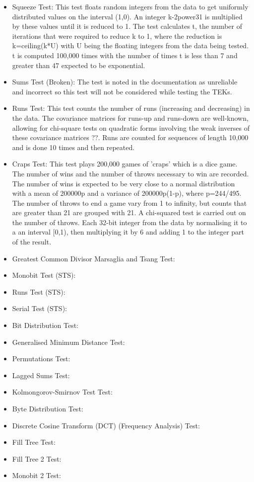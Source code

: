 \begin{itemize}
\item Squeeze Test: This test floats random integers from the data to get uniformly distributed values on the interval (1,0). An integer k-2power31 is multiplied by these values until it is reduced to 1. The test calculates t, the number of iterations that were required to reduce k to 1, where the reduction is k=ceiling(k*U) with U being the floating integers from the data being tested. t is computed 100,000 times with the number of times t is less than 7 and greater than 47 expected to be exponential.
\item Sums Test (Broken): The test is noted in the documentation as unreliable and incorrect so this test will not be considered while testing the TEKs.
\item Runs Test: This test counts the number of runs (increasing and decreasing) in the data. The covariance matrices for runs-up and runs-down are well-known, allowing for chi-square tests on quadratic forms involving the weak inverses of these covariance matrices ??. Runs are counted for sequences of length 10,000 and is done 10 times and then repeated.
\item Craps Test: This test plays 200,000 games of 'craps' which is a dice game. The number of wins and the number of throws necessary to win are recorded. The number of wins is expected to be very close to a normal distribution with a mean of 200000p and a variance of 200000p(1-p), where p=244/495. The number of throws to end a game vary from 1 to infinity, but counts that are greater than 21 are grouped with 21. A chi-squared test is carried out on the number of throws. Each 32-bit integer from the data by normalising it to a an interval [0,1), then multiplying it by 6 and adding 1 to the integer part of the result. 
\item Greatest Common Divisor Marsaglia and Tsang Test:
\item Monobit Test (STS):
\item Runs Test (STS):
\item Serial Test (STS):
\item Bit Distribution Test:
\item Generalised Minimum Distance Test:
\item Permutations Test:
\item Lagged Sums Test:
\item Kolmongorov-Smirnov Test Test:
\item Byte Distribution Test:
\item Discrete Cosine Transform (DCT) (Frequency Analysis) Test:
\item Fill Tree Test:
\item Fill Tree 2 Test:
\item Monobit 2 Test:
\end{itemize}
